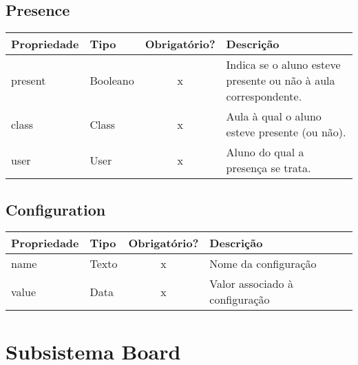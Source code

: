 \subsection{Presence} \label{Presence}
\begin{table}[H]
	\footnotesize
	\begin{tabularx}{\textwidth}{|X|X|c|p{7.8cm}|}   \hline \rowcolor[rgb]{0.8,0.8,0.8}
		
		\textbf{Propriedade} & \textbf{Tipo} & \textbf{Obrigatório?} & \centerline{\textbf{Descrição}} \\\hline  	
		
		present & Booleano & x & Indica se o aluno esteve presente ou não à aula correspondente. \\\hline	
		class & Class & x & Aula à qual o aluno esteve presente (ou não). \\\hline
		user & User & x & Aluno do qual a presença se trata. \\\hline
		
	\end{tabularx}	
\end{table}




\subsection{Configuration} \label{Configuration}
\begin{table}[H]
	\footnotesize
	\begin{tabularx}{\textwidth}{|X|X|c|p{7.8cm}|}   \hline \rowcolor[rgb]{0.8,0.8,0.8}
		
		\textbf{Propriedade} & \textbf{Tipo} & \textbf{Obrigatório?} & \centerline{\textbf{Descrição}} \\\hline  	
		
		name & Texto & x & Nome da configuração \\\hline		
		value & Data & x & Valor associado à configuração \\\hline	
		
	\end{tabularx}	
\end{table}

\newpage

\section{Subsistema Board}

